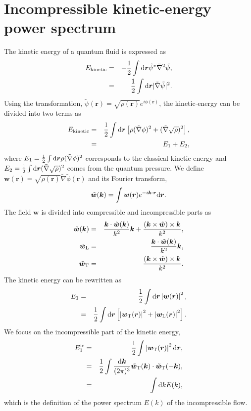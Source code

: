 \documentclass[aps,onecolumn,pra,longbibliography]{revtex4}
\begin{document}
	\section{Incompressible kinetic-energy power spectrum}
	\label{s:pspectrum}
	The kinetic energy of a quantum fluid is expressed as
	\begin{eqnarray}
		E_{{\rm kinetic}} & = & -\frac{1}{2} \int {\rm d}\bm{r} \tilde{\psi}^* \tilde{\nabla}^2 \tilde{\psi},
		\\
		& = & \frac{1}{2}\int {\rm d}\bm{r}|\tilde{\nabla} \tilde{\psi}|^2.
	\end{eqnarray}
	Using the transformation, $\tilde{\psi}(\bm{r}) = \sqrt{\rho(\bm{r})} e^{i \phi(\bm{r})}$,
	the kinetic-energy can be divided into two terms as
	\begin{eqnarray}
		E_{{\rm kinetic}} & = & \frac{1}{2}\int {\rm d}\bm{r}\left[
		\rho(\tilde{\nabla} \phi)^2 + (\tilde{\nabla} \sqrt{\rho})^2
		\right],
		\\
		& = & E_1 + E_2,
	\end{eqnarray}
	where $E_1=\frac{1}{2}\int {\rm d}\bm{r} \rho(\tilde{\nabla} \phi)^2$
	corresponds to the classical kinetic energy
	and $E_2=\frac{1}{2}\int {\rm d}\bm{r} (\tilde{\nabla} \sqrt{\rho})^2$ comes from the quantum pressure.
	We define $\bm{w}(\bm{r})=\sqrt{\rho(\bm{r})}\tilde{\nabla}\tilde{\phi}(\bm{r})$
	and its Fourier transform,
	\begin{eqnarray}
		\tilde{\bm{w}}(\bm{k}) = \int \bm{w}(\bm{r}) e^{-i \bm{k} \cdot \bm{r}} {\rm d} \bm{r}.
	\end{eqnarray}
	The field $\bm{w}$ is divided into compressible and incompressible parts as
	\begin{eqnarray}
		\tilde{\bm{w}}(\bm{k}) & = &
		\frac{\bm{k}\cdot\tilde{\bm{w}}(\bm{k})}{k^2}\bm{k}
		+ \frac{(\bm{k}\times\tilde{\bm{w}})\times\bm{k}}{k^2},
		\\
		\tilde{\bm{w}}_{\rm{L}} & = &
		\frac{\bm{k}\cdot\tilde{\bm{w}}(\bm{k})}{k^2}\bm{k},
		\\
		\tilde{\bm{w}}_{\rm{T}} & = &
		\frac{(\bm{k}\times\tilde{\bm{w}})\times\bm{k}}{k^2}.
	\end{eqnarray}
	The kinetic energy can be rewritten as
	\begin{eqnarray}
		E_1 & = & \frac{1}{2} \int {\rm d}\bm{r}\left|\bm{w}(\bm{r})\right|^2,
		\\
		& = & \frac{1}{2}\int {\rm d}\bm{r} \left[
			\left| \bm{w}_{{\rm T}}(\bm{r})\right|^2
			+ \left| \bm{w}_{{\rm L}}(\bm{r})\right|^2
		\right].
	\end{eqnarray}
	We focus on the incompressible part of the kinetic energy,
	\begin{eqnarray}
		E_1^{{\rm ic}}
		& = & \frac{1}{2} \int \left|\bm{w}_{{\rm T}}(\bm{r}) \right|^2 {\rm d}\bm{r},
		\\
		& = & \frac{1}{2}\int\frac{{\rm d}{\bm k}}{(2 \pi)^3}
		\tilde{\bm{w}}_{{\rm T}}(\bm{k}) \cdot \tilde{\bm{w}}_{{\rm T}}(-\bm{k}),
		\\
		& = & \int {\rm d}k E(k),
	\end{eqnarray}
	which is the definition of the power spectrum $E(k)$ of the incompressible flow.
\end{document}
